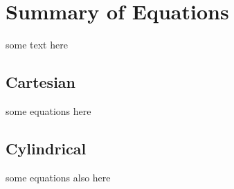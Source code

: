 
\section{Summary of Equations}
some text here
\subsection{Cartesian}
some equations here

\subsection{Cylindrical}
some equations also here